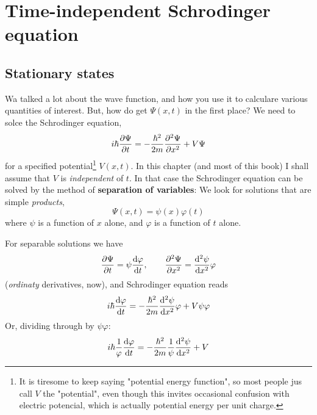\chapter{Time-independent Schrodinger equation}
\section{Stationary states}
Wa talked a lot about the wave function, and how you use it to calculare various quantities of interest. But, how do get $\Psi(x,t)$ in the first place? We need to solce the Schrodinger equation,
\begin{equation}\label{2.1}
	i\hbar\pdv{\Psi}{t}=-\frac{\hbar^2}{2m}\pdv[2]{\Psi}{x}+V\Psi
\end{equation}
for a specified potential\footnote{It is tiresome to keep saying "potential energy function", so most people jus call $V$ the "potential", even though this invites occasional confusion with electric potencial, which is actually potential energy per unit charge.} $V(x,t)$. In this chapter (and most of this book) I shall assume that $V$ is \textit{independent} of $t$. In that case the Schrodinger equation can be solved by the method of \textbf{separation of variables}: We look for solutions that are simple \textit{products},
\begin{equation}\label{2.2}
	\Psi(x,t)=\psi(x)\varphi(t)
\end{equation}
where $\psi$ is a function of $x$ alone, and $\varphi$ is a function of $t$ alone. 

For separable solutions we have
\begin{equation*}
	\pdv{\Psi}{t}=\psi\dv{\varphi}{t},\qquad \pdv[2]{\Psi}{x}=\dv[2]{\psi}{x}\varphi
\end{equation*}
(\textit{ordinaty} derivatives, now), and Schrodinger equation reads
\begin{equation}
	i\hbar\dv{\varphi}{t}=-\frac{\hbar^2}{2m}\dv[2]{\psi}{x}\varphi + V\psi\varphi
\end{equation}
Or, dividing through by $\psi\varphi$:
\begin{equation}\label{2.3}
	i\hbar\frac{1}{\varphi}\dv{\varphi}{t}=-\frac{\hbar^2}{2m}\frac{1}{\psi}\dv[2]{\psi}{x}+V
\end{equation}

